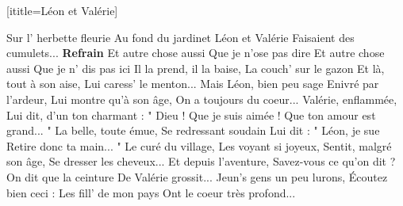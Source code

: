  [ititle={Léon et Valérie}]

\beginverse
Sur l' herbette fleurie
Au fond du jardinet
Léon et Valérie
Faisaient des cumulets...
\endverse
\beginchorus
\textbf{Refrain}
Et autre chose aussi
Que je n'ose pas dire
Et autre chose aussi
Que je n' dis pas ici
\endchorus
\beginverse
Il la prend, il la baise,
La couch' sur le gazon
Et là, tout à son aise,
Lui caress' le menton...
\endverse
\beginverse
Mais Léon, bien peu sage
Enivré par l'ardeur,
Lui montre qu'à son âge,
On a toujours du coeur...
\endverse
\beginverse
Valérie, enflammée,
Lui dit, d'un ton charmant :
" Dieu ! Que je suis aimée !
Que ton amour est grand... "
\endverse
\beginverse
La belle, toute émue,
Se redressant soudain
Lui dit : " Léon, je sue
Retire donc ta main... "
\endverse
\beginverse
Le curé du village,
Les voyant si joyeux,
Sentit, malgré son âge,
Se dresser les cheveux...
\endverse
\beginverse
Et depuis l'aventure,
Savez-vous ce qu'on dit ?
On dit que la ceinture
De Valérie grossit...
\endverse
\beginverse
Jeun's gens un peu lurons,
Écoutez bien ceci :
Les fill' de mon pays
Ont le coeur très profond...
\endverse
\endsong
